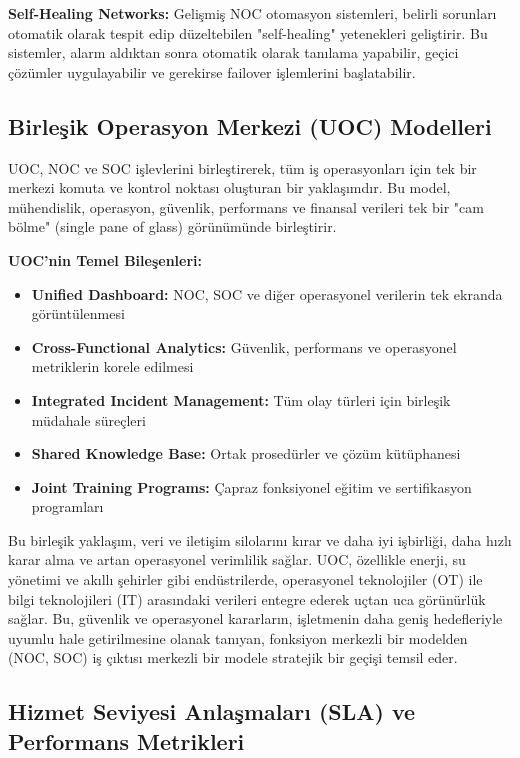 \textbf{Self-Healing Networks:}
Gelişmiş NOC otomasyon sistemleri, belirli sorunları otomatik olarak tespit edip düzeltebilen "self-healing" yetenekleri geliştirir. Bu sistemler, alarm aldıktan sonra otomatik olarak tanılama yapabilir, geçici çözümler uygulayabilir ve gerekirse failover işlemlerini başlatabilir.

\subsection{Birleşik Operasyon Merkezi (UOC) Modelleri}

UOC, NOC ve SOC işlevlerini birleştirerek, tüm iş operasyonları için tek bir merkezi komuta ve kontrol noktası oluşturan bir yaklaşımdır. Bu model, mühendislik, operasyon, güvenlik, performans ve finansal verileri tek bir "cam bölme" (single pane of glass) görünümünde birleştirir.

\textbf{UOC'nin Temel Bileşenleri:}
\begin{itemize}
    \item \textbf{Unified Dashboard:} NOC, SOC ve diğer operasyonel verilerin tek ekranda görüntülenmesi
    \item \textbf{Cross-Functional Analytics:} Güvenlik, performans ve operasyonel metriklerin korele edilmesi
    \item \textbf{Integrated Incident Management:} Tüm olay türleri için birleşik müdahale süreçleri
    \item \textbf{Shared Knowledge Base:} Ortak prosedürler ve çözüm kütüphanesi
    \item \textbf{Joint Training Programs:} Çapraz fonksiyonel eğitim ve sertifikasyon programları
\end{itemize}

Bu birleşik yaklaşım, veri ve iletişim silolarını kırar ve daha iyi işbirliği, daha hızlı karar alma ve artan operasyonel verimlilik sağlar. UOC, özellikle enerji, su yönetimi ve akıllı şehirler gibi endüstrilerde, operasyonel teknolojiler (OT) ile bilgi teknolojileri (IT) arasındaki verileri entegre ederek uçtan uca görünürlük sağlar. Bu, güvenlik ve operasyonel kararların, işletmenin daha geniş hedefleriyle uyumlu hale getirilmesine olanak tanıyan, fonksiyon merkezli bir modelden (NOC, SOC) iş çıktısı merkezli bir modele stratejik bir geçişi temsil eder.

\subsection{Hizmet Seviyesi Anlaşmaları (SLA) ve Performans Metrikleri}

